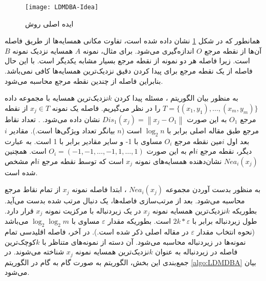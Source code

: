 \begin{figure}[!b]
	\centering
	\texttt{[image: LDMDBA-Idea]}
	\caption[ایده اصلی روش ]{ایده اصلی روش  \cite{xia2015}}
	\label{fig:LDMDBA}
\end{figure}

همانطور که در شکل  \ref{fig:LDMDBA}‏ نشان داده شده است، تفاوت مکانی همسایه‌ها از طریق فاصله آن‌ها از نقطه مرجع $O$ اندازه‌گیری می‌شود. برای مثال، نمونه  $A$ همسایه نزدیک نمونه $B$  است. زیرا فاصله هر دو نمونه از نقطه مرجع  بسیار مشابه یکدیگر است. با این حال فاصله از یک نقطه مرجع برای پیدا کردن دقیق نزدیک‌ترین همسایه‌ها کافی نمی‌باشد. بنابراین فاصله از چندین نقطه مرجع محاسبه می‌شود.

به منظور بیان الگوریتم ، مسئله پیدا کردن  $k$نزدیک‌ترین همسایه با مجموعه داده $T=\{(x_1, y_1),\dots,(x_m, y_m)\}$ را در نظر می‌گیریم. فاصله یک نمونه   $x_{j} \in T$ از نقطه مرجع $O_{1}$  به این صورت $Dis_{1}(x_{j})=\left\|x_{j}-O_{1}\right\|$  نشان داده می‌شود. . تعداد نقاط مرجع طبق مقاله اصلی \cite{xia2015} برابر با  ${{\log }_{2}}n$ است ($n$  بیانگر تعداد ویژگی‌ها است.). مقادیر $i$ بعد اول  $i$مین نقطه مرجع $O_{i}$  مساوی با 1- و سایر مقادیر برابر با 1 است. به عبارت دیگر، نقطه مرجع  $i$ام به این صورت   $O_{i}=(-1,-1,\dots,-1,1,\dots,1)$ است. همچنین $Nea_{i}(x_{j})$ نشان‌دهنده همسایه‌های نمونه $x_j$ است که توسط نقطه مرجع $i$ام مشخص شده است.

به منظور بدست آوردن مجموعه  $Nea_{i}(x_{j})$ ، ابتدا فاصله نمونه  $x_j$ از تمام نقاط مرجع محاسبه می‌شود. بعد از مرتب‌سازی فاصله‌ها، یک دنبال مرتب شده بدست می‌آید. بطوریکه $k$نزدیک‌ترین همسایه نمونه $x_j$  در یک زیردنباله با مرکزیت نمونه  $x_j$  قرار دارد. طول زیردنباله برابر با  $2k*\varepsilon$ است. بطوریکه مقدار $\varepsilon$  مساوی با  ${{\log }_{2}}{{\log }_{2}}m$ می‌باشد (نحوه انتخاب مقدار $\varepsilon$  در مقاله اصلی \cite{xia2015} ذکر شده است.).  در آخر، فاصله اقلیدسی تمام نمونه‌ها در زیردنباله محاسبه می‌شود. آن دسته از نمونه‌های متناظر با  $k$کوچک‌ترین فاصله در زیردنباله به عنوان $k$نزدیک‌ترین همسایه نمونه $x_j$ شناخته می‌شوند. در جمع‌بندی این بخش، الگوریتم  به صورت گام به گام در الگوریتم \ref{algo:LDMDBA} بیان می‌شود.


